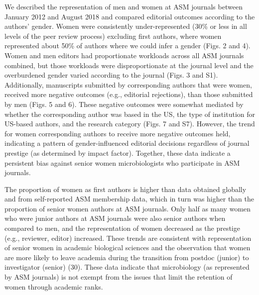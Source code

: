 \documentclass[11pt,]{article}
\begin{document}
We described the representation of men and women at ASM journals between
January 2012 and August 2018 and compared editorial outcomes according
to the authors' gender. Women were consistently under-represented (30\%
or less in all levels of the peer review process) excluding first
authors, where women represented about 50\% of authors where we could
infer a gender (Figs. 2 and 4). Women and men editors had proportionate
workloads across all ASM journals combined, but those workloads were
disproportionate at the journal level and the overburdened gender varied
according to the journal (Figs. 3 and S1). Additionally, manuscripts
submitted by corresponding authors that were women, received more
negative outcomes (e.g., editorial rejections), than those submitted by
men (Figs. 5 and 6). These negative outcomes were somewhat mediated by
whether the corresponding author was based in the US, the type of
institution for US-based authors, and the research category (Figs. 7 and
S7). However, the trend for women corresponding authors to receive more
negative outcomes held, indicating a pattern of gender-influenced
editorial decisions regardless of journal prestige (as determined by
impact factor). Together, these data indicate a persistent bias against
senior women microbiologists who participate in ASM journals.

The proportion of women as first authors is higher than data obtained
globally and from self-reported ASM membership data, which in turn was
higher than the proportion of senior women authors at ASM journals. Only
half as many women who were junior authors at ASM journals were also
senior authors when compared to men, and the representation of women
decreased as the prestige (e.g., reviewer, editor) increased. These
trends are consistent with representation of senior women in academic
biological sciences and the observation that women are more likely to
leave academia during the transition from postdoc (junior) to
investigator (senior) (30). These data indicate that microbiology (as
represented by ASM journals) is not exempt from the issues that limit
the retention of women through academic ranks.
\end{document}
